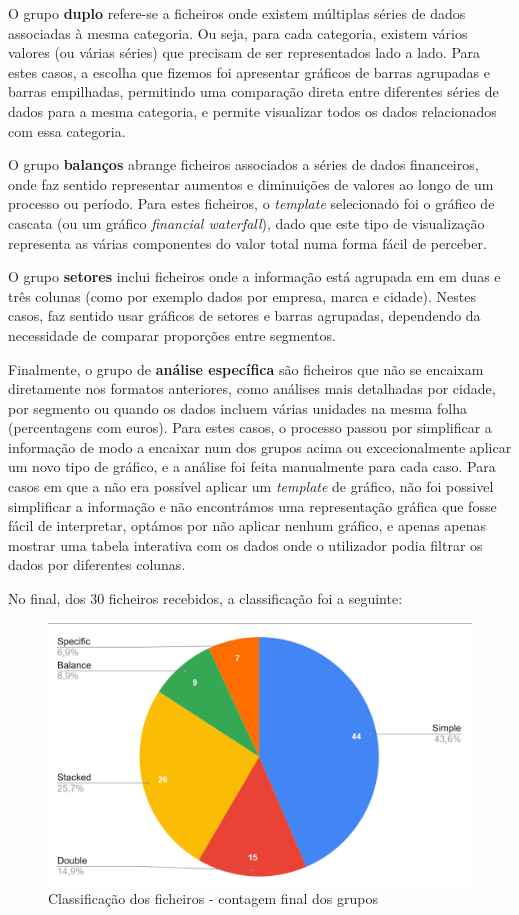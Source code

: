 O grupo \textbf{duplo} refere-se a ficheiros onde existem múltiplas séries de dados associadas à mesma categoria. Ou seja, para cada categoria, existem vários valores (ou várias séries) que precisam de ser representados lado a lado. Para estes casos, a escolha que fizemos foi apresentar gráficos de barras agrupadas e barras empilhadas, permitindo uma comparação direta entre diferentes séries de dados para a mesma categoria, e permite visualizar todos os dados relacionados com essa categoria.

O grupo \textbf{balanços} abrange ficheiros associados a séries de dados financeiros, onde faz sentido representar aumentos e diminuições de valores ao longo de um processo ou período. Para estes ficheiros, o \textit{template} selecionado foi o gráfico de cascata (ou um gráfico \textit{financial waterfall}), dado que este tipo de visualização representa as várias componentes do valor total numa forma fácil de perceber.

O grupo \textbf{setores} inclui ficheiros onde a informação está agrupada em em duas e três colunas (como por exemplo dados por empresa, marca e cidade). Nestes casos, faz sentido usar gráficos de setores e barras agrupadas,  dependendo da necessidade de comparar proporções entre segmentos.

Finalmente, o grupo de \textbf{análise específica} são ficheiros que não se encaixam diretamente nos formatos anteriores, como análises mais detalhadas por cidade, por segmento ou quando os dados incluem várias unidades na mesma folha (percentagens com euros). Para estes casos, o processo passou por simplificar a informação de modo a encaixar num dos grupos acima ou excecionalmente aplicar um novo tipo de gráfico, e a análise foi feita manualmente para cada caso. Para casos em que a não era possível aplicar um \textit{template} de gráfico, não foi possivel simplificar a informação e não encontrámos uma representação gráfica que fosse fácil de interpretar, optámos por não aplicar nenhum gráfico, e apenas apenas mostrar uma tabela interativa com os dados onde o utilizador podia filtrar os dados por diferentes colunas.

No final, dos 30 ficheiros recebidos, a classificação foi a seguinte:

\begin{figure}[h]
    \centering
    \includegraphics[width=\textwidth]{./img/stats1}
 \caption{Classificação dos ficheiros - contagem final dos grupos}
 \end{figure}


